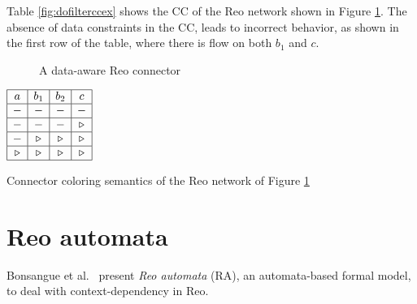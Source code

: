 \begin{BehExample}
Table \ref{fig:dofilterccex} shows the CC of the Reo network shown in Figure \ref{fig:dofilterscc}.  %
 The absence of data constraints in the CC, %
 leads to incorrect behavior, as shown in the first row of the table, where there is flow on both $b_1$ and $c$. 
	
\begin{figure}[!ht]
    \centering
    {\mesaldofilter}
    \caption{A data-aware Reo connector}
    \label{fig:dofilterscc}
\end{figure}      
   
\begin{table}[!ht]
\centering
    $ \begin{array}{|c|c|c|c|} 
   \hline
  a & b_1 & b_2 &c \\ \hline
  - & - & - & - \\ \hline
        - & - & - & \triangleright\\ \hline
       - & \triangleright & \triangleright & \triangleright\\ \hline
      \triangleright & \triangleright & \triangleright & \triangleright\\ \hline
       \end{array}$ 
    \vspace{.5cm}
    \caption{Connector coloring semantics of the Reo network of Figure \ref{fig:dofilterscc}}
\label{fig:dofilterccex}
\end{table}
\end{BehExample}

\section{Reo automata}
\label{sec:ra}
Bonsangue et al.~\cite{Bonsangue2012685} present \emph{Reo automata} (RA), an automata-based formal model, to deal with context-dependency in Reo.

